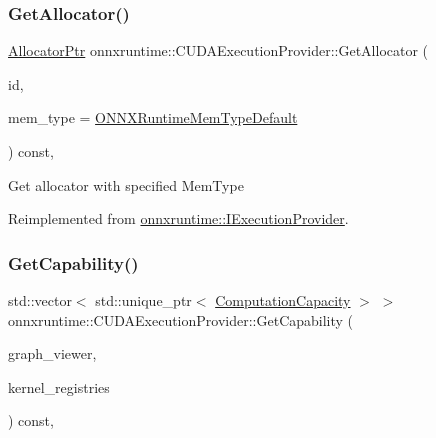 \subsubsection{\texorpdfstring{Get\+Allocator()}{GetAllocator()}}
{\footnotesize\ttfamily \mbox{\hyperlink{namespaceonnxruntime_a6cdac724c5dcefded3a63f08dae58fda}{Allocator\+Ptr}} onnxruntime\+::\+C\+U\+D\+A\+Execution\+Provider\+::\+Get\+Allocator (\begin{DoxyParamCaption}\item[{int}]{id,  }\item[{\mbox{\hyperlink{allocator__info_8h_add3f8ee3ff93395704abae71c30cab18}{O\+N\+N\+X\+Runtime\+Mem\+Type}}}]{mem\+\_\+type = {\ttfamily \mbox{\hyperlink{allocator__info_8h_add3f8ee3ff93395704abae71c30cab18a232271cbf46c229ed40272a63af7a204}{O\+N\+N\+X\+Runtime\+Mem\+Type\+Default}}} }\end{DoxyParamCaption}) const\hspace{0.3cm}{\ttfamily [override]}, {\ttfamily [virtual]}}

Get allocator with specified Mem\+Type 

Reimplemented from \mbox{\hyperlink{classonnxruntime_1_1IExecutionProvider_ab4911f5441a3bd940b0384bc5a334b92}{onnxruntime\+::\+I\+Execution\+Provider}}.

\mbox{\label{classonnxruntime_1_1CUDAExecutionProvider_a1bb04dae34303befc1db6b487dc4c7c5}} 
\subsubsection{\texorpdfstring{Get\+Capability()}{GetCapability()}}
{\footnotesize\ttfamily std\+::vector$<$ std\+::unique\+\_\+ptr$<$ \mbox{\hyperlink{structonnxruntime_1_1ComputationCapacity}{Computation\+Capacity}} $>$ $>$ onnxruntime\+::\+C\+U\+D\+A\+Execution\+Provider\+::\+Get\+Capability (\begin{DoxyParamCaption}\item[{const \mbox{\hyperlink{classonnxruntime_1_1GraphViewer}{onnxruntime\+::\+Graph\+Viewer}} \&}]{graph\+\_\+viewer,  }\item[{const std\+::vector$<$ const \mbox{\hyperlink{classonnxruntime_1_1KernelRegistry}{Kernel\+Registry}} $\ast$$>$ \&}]{kernel\+\_\+registries }\end{DoxyParamCaption}) const\hspace{0.3cm}{\ttfamily [override]}, {\ttfamily [virtual]}}

